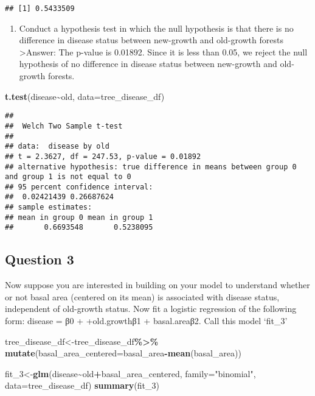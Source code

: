 \documentclass[
]{article}
\newenvironment{Shaded}{\begin{snugshade}}{\end{snugshade}}
\newcommand{\AttributeTok}[1]{\textcolor[rgb]{0.13,0.29,0.53}{#1}}
\newcommand{\FunctionTok}[1]{\textcolor[rgb]{0.13,0.29,0.53}{\textbf{#1}}}
\newcommand{\NormalTok}[1]{#1}
\newcommand{\OtherTok}[1]{\textcolor[rgb]{0.56,0.35,0.01}{#1}}
\newcommand{\SpecialCharTok}[1]{\textcolor[rgb]{0.81,0.36,0.00}{\textbf{#1}}}
\newcommand{\StringTok}[1]{\textcolor[rgb]{0.31,0.60,0.02}{#1}}
\providecommand{\tightlist}{%
  \setlength{\itemsep}{0pt}\setlength{\parskip}{0pt}}
\begin{document}
\begin{verbatim}
## [1] 0.5433509
\end{verbatim}

\begin{enumerate}
\def\labelenumi{\alph{enumi}.}
\setcounter{enumi}{4}
\tightlist
\item
  Conduct a hypothesis test in which the null hypothesis is that there
  is no difference in disease status between new-growth and old-growth
  forests \textgreater Answer: The p-value is 0.01892. Since it is less
  than 0.05, we reject the null hypothesis of no difference in disease
  status between new-growth and old-growth forests.
\end{enumerate}

\begin{Shaded}
\begin{Highlighting}[]
\FunctionTok{t.test}\NormalTok{(disease}\SpecialCharTok{\textasciitilde{}}\NormalTok{old, }\AttributeTok{data=}\NormalTok{tree\_disease\_df)}
\end{Highlighting}
\end{Shaded}

\begin{verbatim}
## 
##  Welch Two Sample t-test
## 
## data:  disease by old
## t = 2.3627, df = 247.53, p-value = 0.01892
## alternative hypothesis: true difference in means between group 0 and group 1 is not equal to 0
## 95 percent confidence interval:
##  0.02421439 0.26687624
## sample estimates:
## mean in group 0 mean in group 1 
##       0.6693548       0.5238095
\end{verbatim}

\hypertarget{question-3}{%
\subsection{Question 3}\label{question-3}}

Now suppose you are interested in building on your model to understand
whether or not basal area (centered on its mean) is associated with
disease status, independent of old-growth status. Now fit a logistic
regression of the following form: disease = β0 + +old.growthβ1 +
basal.areaβ2. Call this model `fit\_3'

\begin{Shaded}
\begin{Highlighting}[]
\NormalTok{tree\_disease\_df}\OtherTok{\textless{}{-}}\NormalTok{tree\_disease\_df}\SpecialCharTok{\%\textgreater{}\%}
  \FunctionTok{mutate}\NormalTok{(}\AttributeTok{basal\_area\_centered=}\NormalTok{basal\_area}\SpecialCharTok{{-}}\FunctionTok{mean}\NormalTok{(basal\_area))}

\NormalTok{fit\_3}\OtherTok{\textless{}{-}}\FunctionTok{glm}\NormalTok{(disease}\SpecialCharTok{\textasciitilde{}}\NormalTok{old}\SpecialCharTok{+}\NormalTok{basal\_area\_centered, }\AttributeTok{family=}\StringTok{"binomial"}\NormalTok{, }\AttributeTok{data=}\NormalTok{tree\_disease\_df)}
\FunctionTok{summary}\NormalTok{(fit\_3)}
\end{Highlighting}
\end{Shaded}
\end{document}
